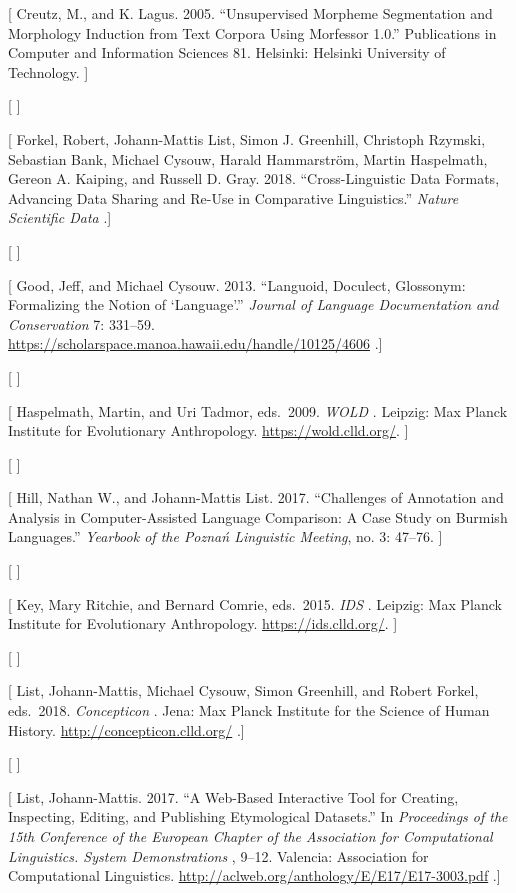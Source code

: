 \documentclass[
  english,
  a4paper,
  oneside,tablecaptionabove
]{scrbook}
\begin{document}
{[} Creutz, M., and K. Lagus. 2005. \enquote{Unsupervised Morpheme
Segmentation and Morphology Induction from Text Corpora Using Morfessor
1.0.} Publications in Computer and Information Sciences 81. Helsinki:
Helsinki University of Technology. {]}

{[} {]}

{[} Forkel, Robert, Johann-Mattis List, Simon J. Greenhill, Christoph
Rzymski, Sebastian Bank, Michael Cysouw, Harald Hammarström, Martin
Haspelmath, Gereon A. Kaiping, and Russell D. Gray. 2018.
\enquote{Cross-Linguistic Data Formats, Advancing Data Sharing and
Re-Use in Comparative Linguistics.} \emph{Nature Scientific Data} .{]}

{[} {]}

{[} Good, Jeff, and Michael Cysouw. 2013. \enquote{Languoid, Doculect,
Glossonym: Formalizing the Notion of \enquote{Language}.} \emph{Journal
of Language Documentation and Conservation} 7: 331--59.
\url{https://scholarspace.manoa.hawaii.edu/handle/10125/4606} .{]}

{[} {]}

{[} Haspelmath, Martin, and Uri Tadmor, eds.~2009. \emph{WOLD} .
Leipzig: Max Planck Institute for Evolutionary Anthropology.
\url{https://wold.clld.org/}. {]}

{[} {]}

{[} Hill, Nathan W., and Johann-Mattis List. 2017. \enquote{Challenges
of Annotation and Analysis in Computer-Assisted Language Comparison: A
Case Study on Burmish Languages.} \emph{Yearbook of the Poznań
Linguistic Meeting}, no. 3: 47--76. {]}

{[} {]}

{[} Key, Mary Ritchie, and Bernard Comrie, eds.~2015. \emph{IDS} .
Leipzig: Max Planck Institute for Evolutionary Anthropology.
\url{https://ids.clld.org/}. {]}

{[} {]}

{[} List, Johann-Mattis, Michael Cysouw, Simon Greenhill, and Robert
Forkel, eds.~2018. \emph{Concepticon} . Jena: Max Planck Institute for
the Science of Human History. \url{http://concepticon.clld.org/} .{]}

{[} {]}

{[} List, Johann-Mattis. 2017. \enquote{A Web-Based Interactive Tool for
Creating, Inspecting, Editing, and Publishing Etymological Datasets.} In
\emph{Proceedings of the 15th Conference of the European Chapter of the
Association for Computational Linguistics. System Demonstrations} ,
9--12. Valencia: Association for Computational Linguistics.
\url{http://aclweb.org/anthology/E/E17/E17-3003.pdf} .{]}
\end{document}
